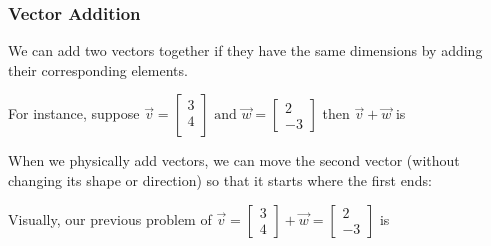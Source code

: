 \documentclass{article}
\begin{document}
\newpage

\subsubsection*{Vector Addition}

We can add two vectors together if they have the same dimensions by adding their corresponding elements. \vspace{0.5in}

For instance, suppose $\vec{v} = \begin{bmatrix} 3 \\ 4\\ \end{bmatrix} \text{ and } \vec{w} = \begin{bmatrix} 2 \\ -3 \end{bmatrix}$	\quad then $\vec{v} + \vec{w}$ is   \vspace{2in}




\newpage

When we physically add vectors, we can move the second vector (without changing its shape or direction) so that it starts where the first ends:   \vspace{1in}

Visually, our previous problem of $\vec{v} = \begin{bmatrix}
3 \\ 4 \end{bmatrix} + \vec{w} = \begin{bmatrix} 2 \\ -3 \end{bmatrix}$ is \vspace{0.5in}

\begin{center}
\end{center}

\newpage
\end{document}
